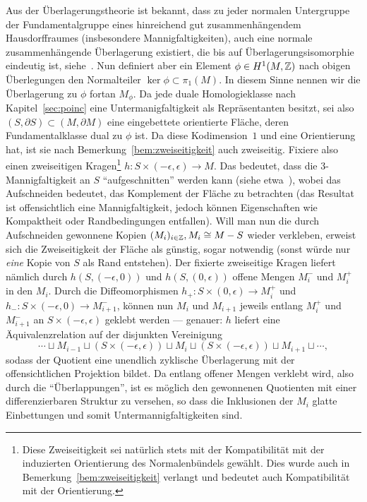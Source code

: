 \begin{constr}
	\label{constr:cut}
	Aus der Überlagerungstheorie ist bekannt, dass zu jeder normalen Untergruppe der Fundamentalgruppe eines hinreichend gut zusammenhängendem Hausdorffraumes (insbesondere Mannigfaltigkeiten), auch eine normale zusammenhängende Überlagerung existiert, die bis auf Überlagerungsisomorphie eindeutig ist, siehe~\cite[Chapter~1.3]{Hatcher.2002}. Nun definiert aber ein Element $\phi\in H^1(M,\mathbb{Z})$ nach obigen Überlegungen den Normalteiler $\ker\phi\subset \pi_1(M)$. In diesem Sinne nennen wir die Überlagerung zu $\phi$ fortan $M_\phi$.  Da jede duale Homologieklasse nach Kapitel~\ref{sec:poinc} eine Untermanigfaltigkeit als Repräsentanten besitzt, sei also $(S,\partial S) \subset (M,\partial M)$ eine eingebettete orientierte Fläche, deren Fundamentalklasse dual zu $\phi$ ist. Da diese Kodimension~$1$ und eine Orientierung hat, ist sie nach Bemerkung~\ref{bem:zweiseitigkeit} auch zweiseitig. Fixiere also einen zweiseitigen Kragen\footnote{Diese Zweiseitigkeit sei natürlich stets mit der Kompatibilität mit der induzierten Orientierung des Normalenbündels gewählt. Dies wurde auch in Bemerkung~\ref{bem:zweiseitigkeit} verlangt und bedeutet auch Kompatibilität mit der Orientierung.} $h:S\times (-\epsilon,\epsilon) \to M$. Das bedeutet, dass die 3-Mannigfaltigkeit an $S$ "`aufgeschnitten"' werden kann (siehe etwa~\cite[Kapitel~4.2]{Burde.2003}), wobei das Aufschneiden bedeutet, das Komplement der Fläche zu betrachten (das Resultat ist offensichtlich eine Mannigfaltigkeit, jedoch können Eigenschaften wie Kompaktheit oder Randbedingungen entfallen). Will man nun die durch Aufschneiden gewonnene Kopien $(M_i)_{i\in \mathbb{Z}}, M_i \cong M-S$ wieder verkleben, erweist sich die Zweiseitigkeit der Fläche als günstig, sogar notwendig (sonst würde nur \emph{eine} Kopie von $S$ als Rand entstehen). Der fixierte zweiseitige Kragen liefert nämlich durch $h(S,(-\epsilon,0))$ und $h(S,(0,\epsilon))$ offene Mengen $M_i^-$ und $M_i^+$ in den $M_i$. Durch die Diffeomorphismen $h_+: S\times (0,\epsilon) \to M_i^+$ und $h_-:S\times (-\epsilon,0) \to M_{i+1}^-$, können nun $M_i$ und $M_{i+1}$ jeweils entlang $M_i^+$ und $M_{i+1}^-$ an $S\times (-\epsilon,\epsilon)$ geklebt werden --- genauer: $h$ liefert eine Äquivalenzrelation auf der disjunkten Vereinigung 
	\[
		\cdots \sqcup M_{i-1} \sqcup (S \times (-\epsilon,\epsilon)) \sqcup M_i \sqcup  (S \times (-\epsilon,\epsilon)) \sqcup M_{i+1} \sqcup \cdots,
	\]
	sodass der Quotient eine unendlich zyklische Überlagerung mit der offensichtlichen Projektion bildet. Da entlang offener Mengen verklebt wird, also durch die "`Überlappungen"', ist es möglich den gewonnenen Quotienten mit einer differenzierbaren Struktur zu versehen, so dass die Inklusionen der $M_i$ glatte Einbettungen und somit Untermannigfaltigkeiten sind.


\end{constr}
